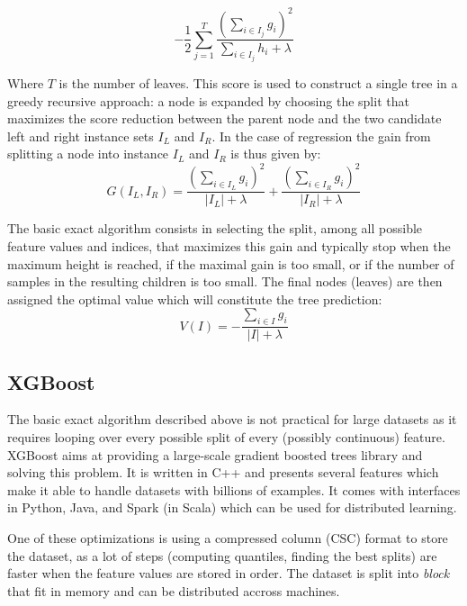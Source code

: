 \documentclass{article}
\theoremstyle{definition}
\begin{document}
\begin{equation} 
- \frac 12 \sum_{j=1}^{T} \frac{\left( \sum_{i \in I_j} g_i \right)^2}{\sum_{i \in I_j} h_i + \lambda}  
\label{objective}
\end{equation} 

Where $T$ is the number of leaves. This score is used to construct a single tree in a greedy recursive approach: a node is expanded by choosing the split that maximizes the score reduction between the parent node and the two candidate left and right instance sets $I_L$ and $I_R$. In the case of regression the gain from splitting a node into instance $I_L$ and $I_R$ is thus given by:
\begin{equation*} 
G(I_L, I_R) = \frac{ \left( \sum_{i \in I_L} g_i \right)^2}{|I_L| + \lambda} + \frac{ \left( \sum_{i \in I_R} g_i \right)^2}{|I_R| + \lambda}
\end{equation*} 

The basic exact algorithm consists in selecting the split, among all possible feature values and indices, that maximizes this gain and typically stop when the maximum height is reached, if the maximal gain is too small, or if the number of samples in the resulting children is too small. The final nodes (leaves) are then assigned the optimal value which will constitute the tree prediction:
\begin{equation}
V(I) = - \frac{\sum_{i \in I} g_i}{\vert I \vert + \lambda}
\label{leafValue}
\end{equation}

\subsection{XGBoost}

The basic exact algorithm described above is not practical for large datasets as it requires looping over every possible split of every (possibly continuous) feature.
XGBoost aims at providing a large-scale gradient boosted trees library and solving this problem. It is written in C++ and presents several features which make
it able to handle datasets with billions of examples. It comes with interfaces in Python, Java, and Spark (in Scala) which can be used for distributed learning.

One of these optimizations is using a compressed column (CSC) format to store the dataset,
as a lot of steps (computing quantiles, finding the best splits) are faster when the feature values are stored in order.
The dataset is split into \textit{block} that fit in memory and can be distributed accross machines. 
\end{document}
